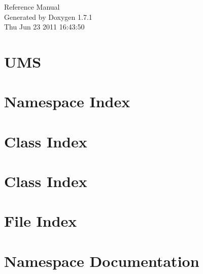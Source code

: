 \documentclass[a4paper]{book}
\begin{document}
\hypersetup{pageanchor=false}
\begin{titlepage}
\vspace*{7cm}
\begin{center}
{\Large Reference Manual}\\
\vspace*{1cm}
{\large Generated by Doxygen 1.7.1}\\
\vspace*{0.5cm}
{\small Thu Jun 23 2011 16:43:50}\\
\end{center}
\end{titlepage}
\clearemptydoublepage
{}
\tableofcontents
\clearemptydoublepage
{}
\hypersetup{pageanchor=true}
\chapter{UMS}
\label{index}\hypertarget{index}{}
\chapter{Namespace Index}

\chapter{Class Index}

\chapter{Class Index}

\chapter{File Index}

\chapter{Namespace Documentation}

\end{document}
